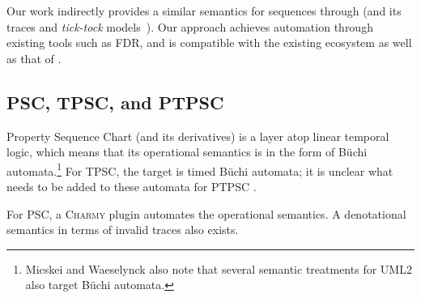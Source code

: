 Our work indirectly provides a similar semantics for \langname{}
sequences through \tockcsp{} (and its traces and \emph{tick-tock} models~\cite{Baxter21-TickTock}).
Our approach achieves automation through existing tools such as FDR,
and is compatible with the existing \robostar{} ecosystem as well as that of
\tockcsp.

\subsection{PSC, TPSC, and PTPSC}

Property Sequence Chart (and its derivatives) is a layer atop
linear temporal logic, which means that its operational semantics is
in the form of B\"uchi automata.\footnote{
Micskei and Waeselynck also note that several semantic treatments for UML2 also
target B\"uchi automata.}
For TPSC, the target is timed B\"uchi
automata; it is unclear what needs to be added to these automata for PTPSC .


For PSC, a \textsc{Charmy} plugin automates the operational semantics.  A denotational semantics in terms of
invalid traces also exists.